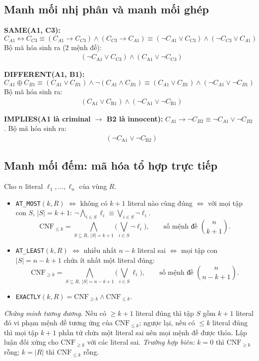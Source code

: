 \documentclass{article}
\newcommand{\code}[1]{\texttt{#1}}
\begin{document}
\subsection{Manh mối nhị phân và manh mối ghép}
\textbf{SAME(A1, C3):}
\[ C_{A1} \leftrightarrow C_{C3} \equiv (C_{A1} \to C_{C3}) \land (C_{C3} \to C_{A1}) \equiv (\neg C_{A1} \lor C_{C3}) \land (\neg C_{C3} \lor C_{A1}) \]
Bộ mã hóa sinh ra (2 mệnh đề):
\begin{align*}
& (\neg C_{\mathrm{A1}} \lor C_{\mathrm{C3}}) \land (C_{\mathrm{A1}} \lor \neg C_{\mathrm{C3}})
\end{align*}

\textbf{DIFFERENT(A1, B1):}
\[ C_{A1} \oplus C_{B1} \equiv (C_{A1} \lor C_{B1}) \land \neg(C_{A1} \land C_{B1}) \equiv (C_{A1} \lor C_{B1}) \land (\neg C_{A1} \lor \neg C_{B1}) \]
Bộ mã hóa sinh ra:
\begin{align*}
& (C_{\mathrm{A1}} \lor C_{\mathrm{B1}}) \land (\neg C_{\mathrm{A1}} \lor \neg C_{\mathrm{B1}})
\end{align*}

\textbf{IMPLIES(A1 là criminal $\to$ B2 là innocent):} $C_{A1} \to \neg C_{B2} \equiv \neg C_{A1} \lor \neg C_{B2}$. Bộ mã hóa sinh ra:
\begin{align*}
& (\neg C_{\mathrm{A1}} \lor \neg C_{\mathrm{B2}})
\end{align*}

\subsection{Manh mối đếm: mã hóa tổ hợp trực tiếp}
Cho $n$ literal $\ell_1,\dots,\ell_n$ của vùng $R$.
\begin{itemize}
    \item \code{AT\_MOST}$(k,R)$ $\iff$ không có $k+1$ literal nào cùng đúng $\iff$ với mọi tập con $S$, $|S| = k+1$: $\neg \bigwedge_{i\in S} \ell_i \equiv \bigvee_{i \in S} \neg \ell_i$.
    \begin{equation} \text{CNF}_{\le k} = \bigwedge_{S \subseteq R,\ |S| = k+1} \Big( \bigvee_{i \in S} \neg \ell_i \Big), \qquad \text{số mệnh đề } \binom{n}{k+1}. \end{equation}
    \item \code{AT\_LEAST}$(k,R)$ $\iff$ nhiều nhất $n-k$ literal sai $\iff$ mọi tập con $|S| = n-k+1$ chứa ít nhất một literal đúng:
    \begin{equation} \text{CNF}_{\ge k} = \bigwedge_{S \subseteq R,\ |S| = n-k+1} \Big( \bigvee_{i \in S} \ell_i \Big), \qquad \text{số mệnh đề } \binom{n}{n-k+1}. \end{equation}
    \item \code{EXACTLY}$(k,R) = \text{CNF}_{\ge k} \land \text{CNF}_{\le k}$.
\end{itemize}
\textit{Chứng minh tương đương.} Nếu có $\ge k+1$ literal đúng thì tập $S$ gồm $k+1$ literal đó vi phạm mệnh đề tương ứng của $\text{CNF}_{\le k}$; ngược lại, nếu có $\le k$ literal đúng thì mọi tập $k+1$ phần tử chứa một literal sai nên mọi mệnh đề được thỏa. Lập luận đối xứng cho $\text{CNF}_{\ge k}$ với các literal sai. \textit{Trường hợp biên:} $k=0$ thì $\text{CNF}_{\ge k}$ rỗng; $k=|R|$ thì $\text{CNF}_{\le k}$ rỗng.
\end{document}
